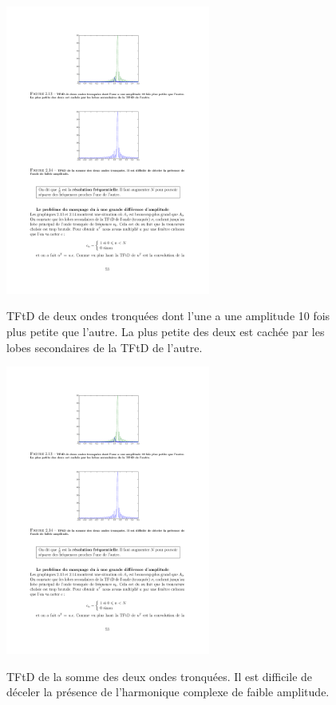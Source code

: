 \begin{figure}
  \centering
  \includegraphics[width=0.6\textwidth]{Figures/Figure2-13}\\
  \caption{TFtD de deux ondes tronqu\'{e}es dont l'une a une amplitude 10 fois plus petite que l'autre. La plus petite des deux est cach\'{e}e par les lobes secondaires de la TFtD de l'autre.}\label{fig:figure2-13}
\end{figure}


\begin{figure}
  \centering
  \includegraphics[width=0.6\textwidth]{Figures/Figure2-14}\\
  \caption{TFtD de la somme des deux ondes tronqu\'{e}es. Il est difficile de d\'{e}celer la pr\'{e}sence de l'harmonique complexe de faible amplitude.}\label{fig:figure2-14}
\end{figure}


